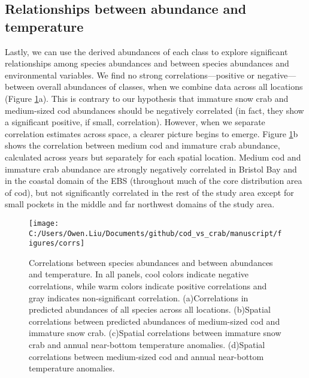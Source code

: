 \documentclass[11pt,]{article}
\begin{document}
\hypertarget{relationships-between-abundance-and-temperature}{%
\subsection{Relationships between abundance and temperature}\label{relationships-between-abundance-and-temperature}}

Lastly, we can use the derived abundances of each class to explore significant relationships among species abundances and between species abundances and environmental variables. We find no strong correlations---positive or negative---between overall abundances of classes, when we combine data across all locations (Figure \ref{fig:corrs}a). This is contrary to our hypothesis that immature snow crab and medium-sized cod abundances should be negatively correlated (in fact, they show a significant positive, if small, correlation). However, when we separate correlation estimates across space, a clearer picture begins to emerge. Figure \ref{fig:corrs}b shows the correlation between medium cod and immature crab abundance, calculated across years but separately for each spatial location. Medium cod and immature crab abundance are strongly negatively correlated in Bristol Bay and in the coastal domain of the EBS (throughout much of the core distribution area of cod), but not significantly correlated in the rest of the study area except for small pockets in the middle and far northwest domains of the study area.

\begin{figure}
\texttt{[image: C:/Users/Owen.Liu/Documents/github/cod\_vs\_crab/manuscript/figures/corrs]} \caption{Correlations between species abundances and between abundances and temperature. In all panels, cool colors indicate negative correlations, while warm colors indicate positive correlations and gray indicates non-significant correlation. (a)Correlations in predicted abundances of all species across all locations. (b)Spatial correlations between predicted abundances of medium-sized cod and immature snow crab. (c)Spatial correlations between immature snow crab and annual near-bottom temperature anomalies. (d)Spatial correlations between medium-sized cod and annual near-bottom temperature anomalies.}\label{fig:corrs}
\end{figure}
\end{document}
